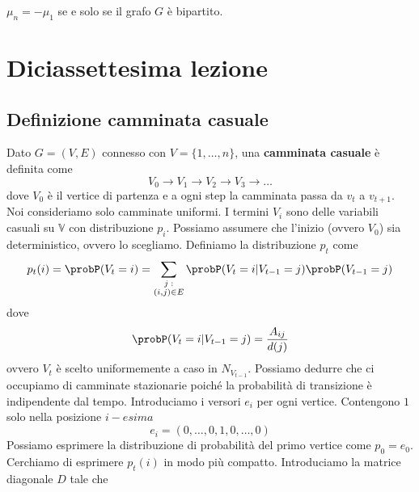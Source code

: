 \documentclass[12pt]{report}
\begin{document}
\begin{fatto}
    $\mu_n = -\mu_1$ se e solo se il grafo $G$ è bipartito.
\end{fatto}


\chapter{Diciassettesima lezione}

\section{Definizione camminata casuale}

\noindent 
Dato $G = (V,E)$ connesso con $V = \{1,\dots,n\}$, una \textbf{camminata casuale} è definita come
$$V_0 \rightarrow V_1 \rightarrow V_2 \rightarrow V_3 \rightarrow \dots$$
dove $V_0$ è il vertice di partenza e a ogni step la camminata passa da $v_t$ a $v_{t+1}$. Noi consideriamo solo camminate uniformi. I termini $V_i$ sono delle variabili casuali su $\mathds{V}$  con distribuzione $p_i$. Possiamo assumere che l'inizio (ovvero $V_0$) sia deterministico, ovvero lo scegliamo. Definiamo la distribuzione $p_t$ come
$$p_t(i) = \probP(V_t = i) =  \sum_{\substack{j\;:\\ (i,j) \in E}} \probP(V_t = i | V_{t-1} = j) \probP(V_{t-1} = j)$$
dove
$$\probP(V_t=i|V_{t-1} = j) = \frac{A_{ij}}{d(j)}$$
ovvero $V_t$ è scelto uniformemente a caso in $N_{V_{t-1}}$. Possiamo dedurre che ci occupiamo di camminate stazionarie poiché la probabilità di transizione è indipendente dal tempo. Introduciamo i versori $e_i$ per ogni vertice. Contengono $1$ solo nella posizione $i-esima$
$$e_i = (0,\dots,0,1,0,\dots,0)$$
Possiamo esprimere la distribuzione di probabilità del primo vertice come $p_0 = e_0$.
Cerchiamo di esprimere $p_t(i)$ in modo più compatto. Introduciamo la matrice diagonale $D$ tale che
\end{document}
